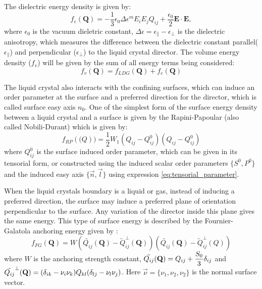 \documentclass[final,5p,times,twocolumn]{elsarticle}
\begin{document}
The dielectric energy density is given by:
\begin{equation}
 f_e(\mathbf{Q})= -\dfrac{1}{3} \epsilon_0 \Delta \epsilon^m E_i E_j Q_{ij}+ \dfrac{\epsilon_0}{2}  \mathbf{E} \cdot \mathbf{E},
\end{equation}
where $\epsilon_0$ is the vacuum dieletric constant,
$\Delta \epsilon=\epsilon_{\parallel} - \epsilon_{\perp}$ is the
dielectric anisotropy, which measures the difference between the
dielectric constant parallel($\epsilon_{\parallel}$) and perpendicular
($\epsilon_{\perp}$) to the liquid crystal director.  The volume energy
density ($f_v$) will be given by the sum of all energy terms being considered:
\begin{equation}\label{eq:total_energy}
  f_v(\mathbf{Q})=f_{LDG}(\mathbf{Q})+f_e(\mathbf{Q})
\end{equation}

The liquid crystal also interacts with the confining surfaces, which
can induce an order parameter at the surface and a preferred direction
for the director, which is called surface easy axis $n_0$. One of the
simplest form of the surface energy density between a liquid crystal
and a surface is given by the Rapini-Papoular (also called Nobili-Durant) which is given by:
\begin{equation}
\label{RP}
  f_{RP}(\mathbf(Q))=\dfrac{1}{2} W_1 (Q_{ij}-Q^0_{ij}) (Q_{ij}-Q^0_{ij})
\end{equation}
where $Q_{ij}^0$ is the surface induced order parameter, which can be
given in its tensorial form, or constructed using the induced scalar
order parameters $\lbrace S^0, P^0 \rbrace$ and the induced easy axis
$\lbrace \vec{n}, \vec{l} \rbrace$ using expression
\ref{eq:tensorial_parameter}.

When the liquid crystals boundary is a liquid or gas, instead of
inducing a preferred direction, the surface may induce a preferred
plane of orientation perpendicular to the surface. Any variation of
the director inside this plane gives the same energy. This type of
surface energy is described by the Fournier-Galatola anchoring energy
given by \cite{Sec2012}:
\begin{equation} \label{eq:penalizacao}
f_{FG}(\mathbf{Q})=W\left( \tilde{Q_{ij}}(\mathbf{Q}) - \tilde{Q}_{ij}^{\perp}(\mathbf{Q}) \right)\left( \tilde{Q_{ij}}(\mathbf{Q}) - \tilde{Q}_{ij}^{\perp}(\mathbf{}{Q}) \right)
\end{equation}
where $W$ is the anchoring strength constant,
$\tilde{Q_{ij}}(\bold{Q})=Q_{ij}+\dfrac{S_0}{3} \delta_{ij}$ and
$\tilde{Q_{ij}}^{\perp}(\bold{Q})=(\delta_{ik}-\nu_i \nu_k)Q_{kl}
(\delta_{lj}-\nu_l \nu_j)$. Here $\vec{\nu}=\lbrace\nu_1,\nu_2,\nu_2 \rbrace$ is the normal surface vector.
\end{document}
